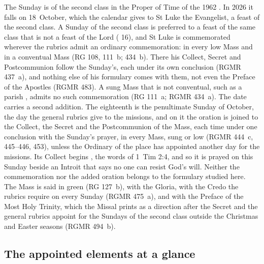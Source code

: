 The Sunday is of the second class in the Proper of Time of the 1962
. In 2026 it falls on 18~October, which the calendar gives to St Luke
the Evangelist, a feast of the second class. A Sunday of the second class is
preferred to a feast of the same class that is not a feast of the Lord
( 16), and St Luke is commemorated wherever the rubrics
admit an ordinary commemoration: in every low Mass and in a conventual Mass (RG
108, 111~b;  434~b). There his Collect, Secret
and Postcommunion follow the Sunday's, each under its own conclusion (RGMR
437~a), and nothing else of his formulary comes with them, not even the Preface
of the Apostles (RGMR 483). A sung Mass that is not conventual, such as a parish
, admits no such commemoration (RG 111~a; RGMR 434~a). The
date carries a second addition. The eighteenth is the penultimate Sunday of
October, the day the general rubrics give to the missions, and on it the
oration  is joined to the Collect, the Secret and
the Postcommunion of the Mass, each time under one conclusion with the Sunday's
prayer, in every Mass, sung or low (RGMR 444~c, 445--446, 453), unless the
Ordinary of the place has appointed another day for the missions. Its Collect
begins , the words of 1~Tim 2:4,
and so it is prayed on this Sunday beside an Introit that says no one can resist
God's will. Neither the commemoration nor the added oration belongs to the
formulary studied here. The Mass is said in green (RG 127~b), with the Gloria,
with the Credo the rubrics require on every Sunday (RGMR 475~a), and with the
Preface of the Most Holy Trinity, which the Missal prints as a direction after
the Secret and the general rubrics appoint for the Sundays of the second class
outside the Christmas and Easter seasons (RGMR 494~b).

\subsection{The appointed elements at a glance}

